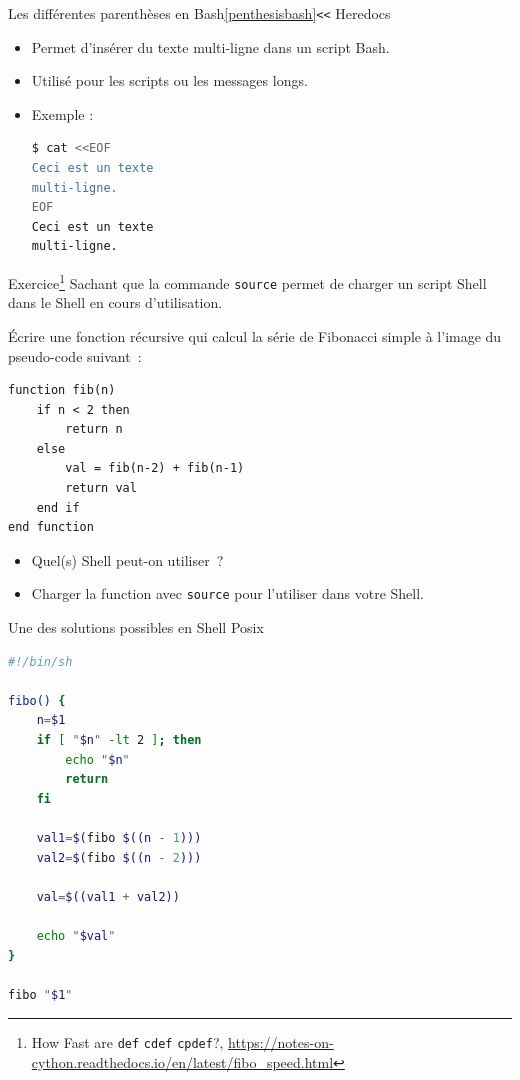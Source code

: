 \documentclass{beamer}
\begin{document}
    \begin{frame}[fragile]{Les différentes parenthèses en Bash\cref{penthesisbash}}{\lstinline{<<} Heredocs}
        \begin{itemize}
            \item Permet d'insérer du texte multi-ligne dans un script Bash.
            \item Utilisé pour les scripts ou les messages longs.
            \item Exemple :
            \begin{lstlisting}[language=bash]
$ cat <<EOF
Ceci est un texte
multi-ligne.
EOF
Ceci est un texte
multi-ligne.
            \end{lstlisting}
        \end{itemize}
    \end{frame}

    \begin{frame}[fragile]{Exercice\footnote{\label{fibo-ross}How Fast are \lstinline{def} \lstinline{cdef} \lstinline{cpdef}?, \url{https://notes-on-cython.readthedocs.io/en/latest/fibo_speed.html}} \execcounterdispinc{}}
        Sachant que la commande \lstinline{source} permet de charger un script Shell dans le Shell en cours d'utilisation.

        Écrire une fonction récursive qui calcul la série de Fibonacci simple à l'image du pseudo-code suivant~:
        \begin{footnotesize}
            \begin{verbatim}
function fib(n)
    if n < 2 then
        return n
    else
        val = fib(n-2) + fib(n-1)
        return val
    end if
end function
            \end{verbatim}
        \end{footnotesize}
        \begin{itemize}
            \item Quel(s) Shell peut-on utiliser~?
            \item Charger la function avec \lstinline{source} pour l'utiliser dans votre Shell.
        \end{itemize}
    \end{frame}

    \begin{frame}[fragile]{Une des solutions possibles en Shell Posix}
        \begin{lstlisting}[language=bash]
#!/bin/sh

fibo() {
    n=$1
    if [ "$n" -lt 2 ]; then
        echo "$n"
        return
    fi

    val1=$(fibo $((n - 1)))
    val2=$(fibo $((n - 2)))

    val=$((val1 + val2))

    echo "$val"
}

fibo "$1"
        \end{lstlisting}
    \end{frame}
\end{document}
